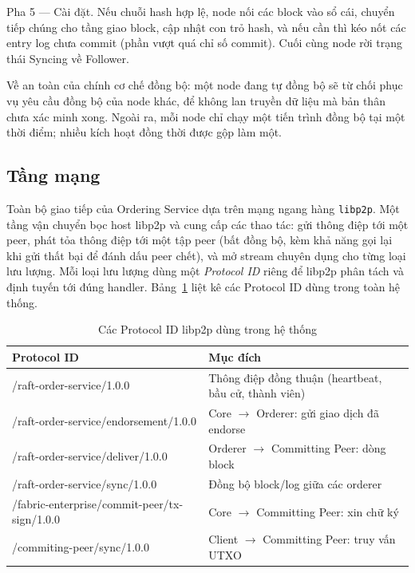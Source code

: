 Pha 5 --- Cài đặt. Nếu chuỗi hash hợp lệ, node nối các block vào sổ cái,
chuyển tiếp chúng cho tầng giao block, cập nhật con trỏ hash, và nếu cần thì kéo
nốt các entry log chưa commit (phần vượt quá chỉ số commit). Cuối cùng node rời
trạng thái Syncing về Follower.

Về an toàn của chính cơ chế đồng bộ: một node đang tự đồng bộ sẽ từ chối
phục vụ yêu cầu đồng bộ của node khác, để không lan truyền dữ liệu mà bản thân
chưa xác minh xong. Ngoài ra, mỗi node chỉ chạy một tiến trình đồng bộ tại một thời
điểm; nhiều kích hoạt đồng thời được gộp làm một.

\subsection{Tầng mạng}
\label{sec:ordering-network}

Toàn bộ giao tiếp của Ordering Service dựa trên mạng ngang hàng \texttt{libp2p}.
Một tầng vận chuyển bọc host libp2p và cung cấp các thao tác: gửi thông điệp tới
một peer, phát tỏa thông điệp tới một tập peer (bất đồng bộ, kèm khả năng gọi lại
khi gửi thất bại để đánh dấu peer chết), và mở stream chuyên dụng cho từng loại
lưu lượng. Mỗi loại lưu lượng dùng một \textit{Protocol ID} riêng để libp2p phân
tách và định tuyến tới đúng handler. Bảng~\ref{tab:protocols} liệt kê các Protocol
ID dùng trong toàn hệ thống.

\begin{table}[H]
\centering
\caption{Các Protocol ID libp2p dùng trong hệ thống}
\label{tab:protocols}
\begin{tabular}{@{}p{6.4cm}p{6cm}@{}}
\toprule
\textbf{Protocol ID} & \textbf{Mục đích} \\
\midrule
/raft-order-service/1.0.0 & Thông điệp đồng thuận (heartbeat, bầu cử, thành viên) \\
/raft-order-service/endorsement/1.0.0 & Core $\rightarrow$ Orderer: gửi giao dịch đã endorse \\
/raft-order-service/deliver/1.0.0 & Orderer $\rightarrow$ Committing Peer: dòng block \\
/raft-order-service/sync/1.0.0 & Đồng bộ block/log giữa các orderer \\
/fabric-enterprise/commit-peer/tx-sign/1.0.0 & Core $\rightarrow$ Committing Peer: xin chữ ký \\
/commiting-peer/sync/1.0.0 & Client $\rightarrow$ Committing Peer: truy vấn UTXO \\
\bottomrule
\end{tabular}
\end{table}

